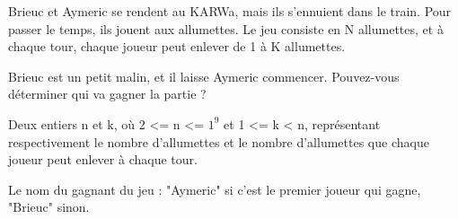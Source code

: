 \problemname{\problemyamlname}

Brieuc et Aymeric se rendent au KARWa, mais ils s'ennuient dans le train. Pour passer le temps, ils jouent aux allumettes. Le jeu consiste en N allumettes,
et à chaque tour, chaque joueur peut enlever de 1 à K allumettes.

Brieuc est un petit malin, et il laisse Aymeric commencer. Pouvez-vous déterminer qui va gagner la partie ?

\begin{Input}
    Deux entiers n et k, où 2 <= n <= $1^9$ et 1 <= k < n, représentant respectivement le nombre d'allumettes et le nombre d'allumettes que chaque joueur peut enlever à chaque tour.
\end{Input}

\begin{Output}
    Le nom du gagnant du jeu : "Aymeric" si c'est le premier joueur qui gagne, "Brieuc" sinon.
\end{Output}

